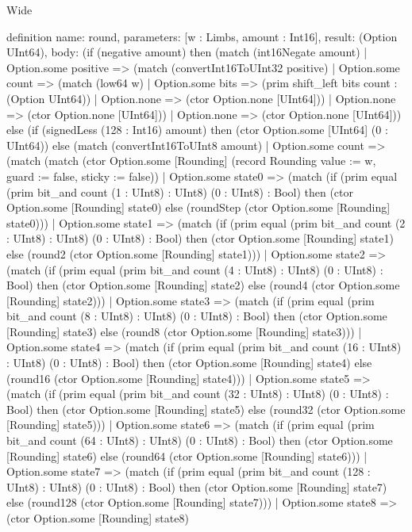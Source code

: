 \begin{lexlean}{Wide}
\begin{semanticmodule}
definition{
  name: round,
  parameters: [w : Limbs, amount : Int16],
  result: (Option UInt64),
  body: (if (negative amount) then (match (int16Negate amount)
    | Option.some positive => (match (convertInt16ToUInt32 positive)
      | Option.some count => (match (low64 w)
        | Option.some bits => (prim shift_left bits count : (Option UInt64))
        | Option.none => (ctor Option.none [UInt64]))
      | Option.none => (ctor Option.none [UInt64]))
    | Option.none => (ctor Option.none [UInt64])) else (if (signedLess (128 : Int16) amount) then (ctor Option.some [UInt64] (0 : UInt64)) else (match (convertInt16ToUInt8 amount)
    | Option.some count => (match (match (ctor Option.some [Rounding] (record Rounding {value := w, guard := false, sticky := false}))
        | Option.some state0 => (match (if (prim equal (prim bit_and count (1 : UInt8) : UInt8) (0 : UInt8) : Bool) then (ctor Option.some [Rounding] state0) else (roundStep (ctor Option.some [Rounding] state0)))
          | Option.some state1 => (match (if (prim equal (prim bit_and count (2 : UInt8) : UInt8) (0 : UInt8) : Bool) then (ctor Option.some [Rounding] state1) else (round2 (ctor Option.some [Rounding] state1)))
            | Option.some state2 => (match (if (prim equal (prim bit_and count (4 : UInt8) : UInt8) (0 : UInt8) : Bool) then (ctor Option.some [Rounding] state2) else (round4 (ctor Option.some [Rounding] state2)))
              | Option.some state3 => (match (if (prim equal (prim bit_and count (8 : UInt8) : UInt8) (0 : UInt8) : Bool) then (ctor Option.some [Rounding] state3) else (round8 (ctor Option.some [Rounding] state3)))
                | Option.some state4 => (match (if (prim equal (prim bit_and count (16 : UInt8) : UInt8) (0 : UInt8) : Bool) then (ctor Option.some [Rounding] state4) else (round16 (ctor Option.some [Rounding] state4)))
                  | Option.some state5 => (match (if (prim equal (prim bit_and count (32 : UInt8) : UInt8) (0 : UInt8) : Bool) then (ctor Option.some [Rounding] state5) else (round32 (ctor Option.some [Rounding] state5)))
                    | Option.some state6 => (match (if (prim equal (prim bit_and count (64 : UInt8) : UInt8) (0 : UInt8) : Bool) then (ctor Option.some [Rounding] state6) else (round64 (ctor Option.some [Rounding] state6)))
                      | Option.some state7 => (match (if (prim equal (prim bit_and count (128 : UInt8) : UInt8) (0 : UInt8) : Bool) then (ctor Option.some [Rounding] state7) else (round128 (ctor Option.some [Rounding] state7)))
                        | Option.some state8 => (ctor Option.some [Rounding] state8)
}
\end{semanticmodule}
\end{lexlean}
